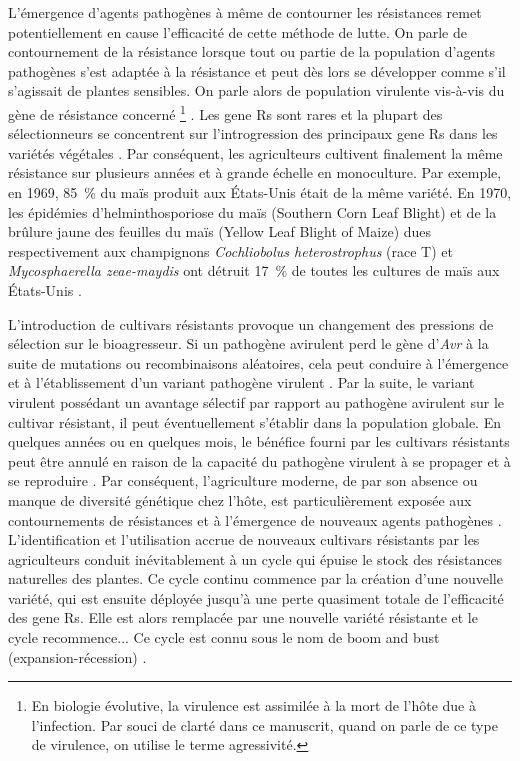 	 L'émergence d'agents pathogènes à même de contourner les résistances remet potentiellement en cause l'efficacité de cette méthode de lutte. On parle de contournement de la résistance lorsque tout ou partie de la population d'agents pathogènes s'est adaptée à la résistance et peut dès lors se développer comme s’il s’agissait de plantes sensibles. On parle alors de population \og virulente \fg{} vis-à-vis du gène de résistance concerné \footnote{En biologie évolutive, la virulence est assimilée à la mort de l'hôte due à l'infection. Par souci de clarté dans ce manuscrit, quand on parle de ce type de virulence, on utilise le terme agressivité.} \citep{McDonald2002}. Les \glspl{gene R} sont rares et la plupart des sélectionneurs se concentrent sur l'introgression des principaux \glspl{gene R} dans les variétés végétales \citep{Zhan2015}. Par conséquent, les agriculteurs cultivent finalement la même résistance sur plusieurs années et à grande échelle en monoculture.  Par exemple, en 1969, 85~\% du maïs produit aux États-Unis était de la même variété.
  En 1970, les épidémies  d'helminthosporiose du maïs  (Southern Corn Leaf Blight) et de la \og brûlure jaune des feuilles du maïs \fg{} (Yellow Leaf Blight of Maize) dues respectivement aux champignons \textit{Cochliobolus heterostrophus} (race T) et  \textit{Mycosphaerella zeae-maydis}    ont détruit 17~\% de toutes les cultures de maïs aux États-Unis \citep{Pring1989}.

	 L'introduction de cultivars résistants  provoque un changement des pressions de sélection sur le bioagresseur.  Si un pathogène avirulent perd le gène d'\textit{Avr} à la suite de mutations ou recombinaisons aléatoires, cela peut conduire   à l'émergence et à l'établissement d'un variant pathogène virulent  \citep{McDonald2002, Castagnone-Sereno2002, Garcia-arenal2003a, Parlevliet2002, Moffat2001}. Par la suite, le variant virulent possédant un avantage sélectif par rapport au pathogène avirulent  sur le cultivar résistant, il peut éventuellement s'établir dans la population globale.  En quelques années ou en quelques mois, le bénéfice
fourni par les cultivars résistants peut être annulé en raison de la capacité du pathogène virulent à se propager et à se reproduire \citep{McDonald2002, Parlevliet2002}. Par conséquent, l'agriculture moderne, de par son absence ou manque de diversité génétique chez l'hôte, est  particulièrement exposée aux contournements de résistances et à l’émergence de
nouveaux agents pathogènes \citep{Stukenbrock2008, Anderson2004}. L’identification et l'utilisation accrue de nouveaux cultivars résistants par  les agriculteurs conduit inévitablement à un cycle qui épuise le stock des résistances naturelles des plantes. Ce cycle continu commence par la création d'une nouvelle variété, qui est ensuite déployée jusqu'à une perte quasiment totale de l'efficacité des \glspl{gene R}. Elle est alors remplacée par une nouvelle variété résistante et le cycle recommence... Ce cycle est connu sous le nom de \og boom and bust \fg{} (expansion-récession) \citep{Brown2011, Brown2015, Zhan2015}.

